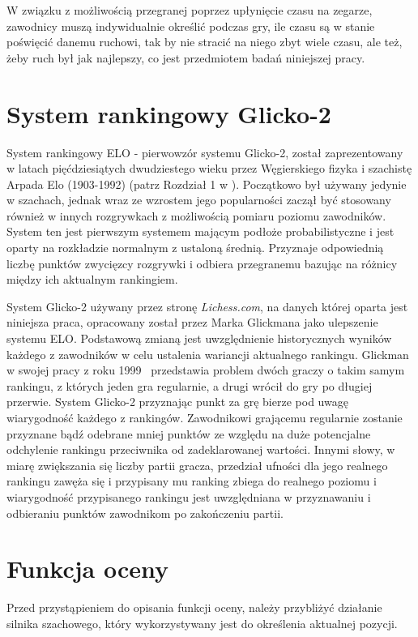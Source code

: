 \documentclass[inzynierska]{pwr_wmat_praca_dyplomowa}
\theoremstyle{plain}
\numberwithin{theorem}{chapter}
\theoremstyle{definition}
\numberwithin{theorem}{chapter}
\begin{document}
W związku z możliwością przegranej poprzez upłynięcie czasu na zegarze, zawodnicy muszą indywidualnie określić podczas gry, ile czasu są w stanie poświęcić danemu ruchowi, tak by nie stracić na niego zbyt wiele czasu, ale też, żeby ruch był jak najlepszy, co jest przedmiotem badań niniejszej pracy.

\section{System rankingowy Glicko-2}
System rankingowy ELO - pierwowzór systemu Glicko-2, został zaprezentowany w latach pięćdziesiątych dwudziestego wieku przez Węgierskiego fizyka i szachistę Arpada Elo (1903-1992) (patrz Rozdział 1 w \cite{elo}). Początkowo był używany jedynie w szachach, jednak wraz ze wzrostem jego popularności zaczął być stosowany również w innych rozgrywkach z możliwością pomiaru poziomu zawodników. System ten jest pierwszym systemem mającym podłoże probabilistyczne i jest oparty na rozkładzie normalnym z ustaloną średnią. Przyznaje odpowiednią liczbę punktów zwycięzcy rozgrywki i odbiera przegranemu bazując na różnicy między ich aktualnym rankingiem.


System Glicko-2  używany przez stronę \textit{Lichess.com}, na danych której oparta jest niniejsza praca, opracowany został przez Marka Glickmana jako ulepszenie systemu ELO. Podstawową zmianą jest uwzględnienie historycznych wyników każdego z zawodników w celu ustalenia wariancji aktualnego rankingu. Glickman w swojej pracy z roku 1999~\cite{glicko} przedstawia problem dwóch graczy o takim samym rankingu, z których jeden gra regularnie, a drugi wrócił do gry po długiej przerwie. System Glicko-2 przyznając punkt za grę bierze pod uwagę wiarygodność każdego z rankingów. Zawodnikowi grającemu regularnie zostanie przyznane bądź odebrane mniej punktów ze względu na duże potencjalne odchylenie rankingu przeciwnika od zadeklarowanej wartości. Innymi słowy, w miarę zwiększania się liczby partii gracza, przedział ufności dla jego realnego rankingu zawęża się i przypisany mu ranking zbiega do realnego poziomu i wiarygodność przypisanego rankingu jest uwzględniana w przyznawaniu i odbieraniu punktów zawodnikom po zakończeniu partii.

\section{Funkcja oceny}
Przed przystąpieniem do opisania funkcji oceny, należy przybliżyć działanie silnika szachowego, który wykorzystywany jest do określenia aktualnej pozycji.
\end{document}
